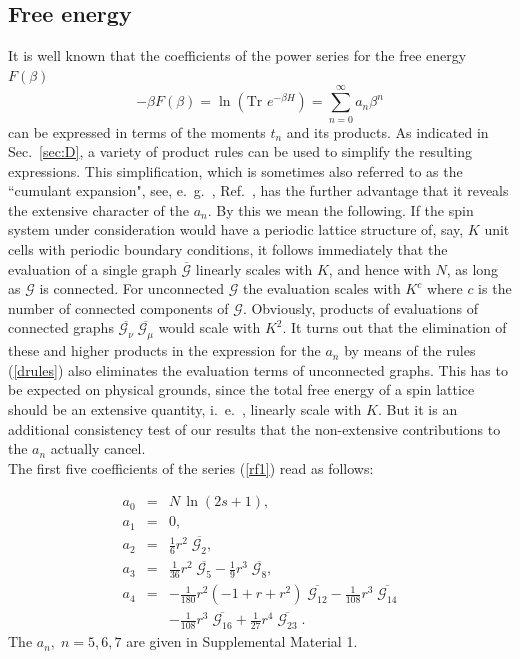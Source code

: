 \documentclass[aps,twocolumn,groupedaddress]{revtex4}
\begin{document}
\subsection{Free energy}\label{sec:R_f}
It is well known that the coefficients of the power series for the
free energy $F(\beta)$
\begin{equation}\label{rf1}
-\beta F(\beta)=\ln\left( \mbox{Tr } e^{-\beta
H}\right)=\sum_{n=0}^{\infty} a_n \beta^n
\end{equation}
can be expressed in terms of the moments $t_n$ and its products. As
indicated in Sec.~\ref{sec:D}, a variety of product rules can be
used to simplify the resulting expressions. This simplification,
which is sometimes also referred to as the ``cumulant expansion",
see, e.~g.~, Ref.~, has the further advantage that it reveals the
extensive character of the $a_n$. By this we mean the following. If
the spin system under consideration would have a periodic lattice
structure of, say, $K$  unit cells with periodic boundary
conditions, it follows immediately that the evaluation of a single
graph $\overline{{\mathcal G}}$ linearly scales with $K$, and hence
with $N$, as long as ${\mathcal G}$ is connected. For unconnected
${\mathcal G}$ the evaluation scales with $K^c$ where $c$ is the
number of connected components of ${\mathcal G}$. Obviously,
products of evaluations of connected graphs $\overline{{\mathcal
G}_\nu}\;\overline{{\mathcal G}_\mu}$ would scale with $K^2$. It
turns out that the elimination of these and higher products in the
expression for the $a_n$ by means of the rules (\ref{drules}) also
eliminates the evaluation terms of unconnected graphs. This has to
be expected on physical grounds, since the total free energy of a
spin lattice should be an extensive quantity, i.~e.~, linearly scale
with $K$.
But it is an additional consistency test of our results that the
non-extensive contributions to the $a_n$ actually cancel.\\

The first five coefficients of the series (\ref{rf1}) read as
follows:

\begin{eqnarray} \label{rf2a}
a_0&=&N\,\ln(2s+1),\\ \label{rf2b} a_1&=&0, \\ \label{rf2c}
a_2&=&\frac{1}{6}r^2\; \overline{{\mathcal G}_2},\\ \label{rf2d}
a_3&=&\frac{1}{36}r^2 \; \overline{{\mathcal G}_5} -\frac{1}{9}r^3\;
\overline{{\mathcal G}_{8}},\\ \nonumber a_4&=&-\frac{1}{180}r^2(-1
+ r + r^2) \; \overline{{\mathcal G}_{12}} -\frac{1}{108}r^3\;
\overline{{\mathcal G}_{14}}\\\label{rf2e} &&-\frac{1}{108}r^3\;
\overline{{\mathcal G}_{16}} +\frac{1}{27}r^4\; \overline{{\mathcal
G}_{23}} \;.
\end{eqnarray}
The $a_n,\;n=5,6,7$ are given in Supplemental Material 1.\cite{supp1}
\end{document}
